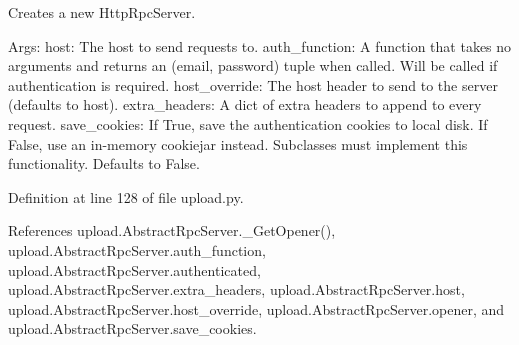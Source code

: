 \begin{DoxyVerb}Creates a new HttpRpcServer.

Args:
  host: The host to send requests to.
  auth_function: A function that takes no arguments and returns an
(email, password) tuple when called. Will be called if authentication
is required.
  host_override: The host header to send to the server (defaults to host).
  extra_headers: A dict of extra headers to append to every request.
  save_cookies: If True, save the authentication cookies to local disk.
If False, use an in-memory cookiejar instead.  Subclasses must
implement this functionality.  Defaults to False.
\end{DoxyVerb}
 

Definition at line 128 of file upload.\+py.



References upload.\+Abstract\+Rpc\+Server.\+\_\+\+Get\+Opener(), upload.\+Abstract\+Rpc\+Server.\+auth\+\_\+function, upload.\+Abstract\+Rpc\+Server.\+authenticated, upload.\+Abstract\+Rpc\+Server.\+extra\+\_\+headers, upload.\+Abstract\+Rpc\+Server.\+host, upload.\+Abstract\+Rpc\+Server.\+host\+\_\+override, upload.\+Abstract\+Rpc\+Server.\+opener, and upload.\+Abstract\+Rpc\+Server.\+save\+\_\+cookies.


